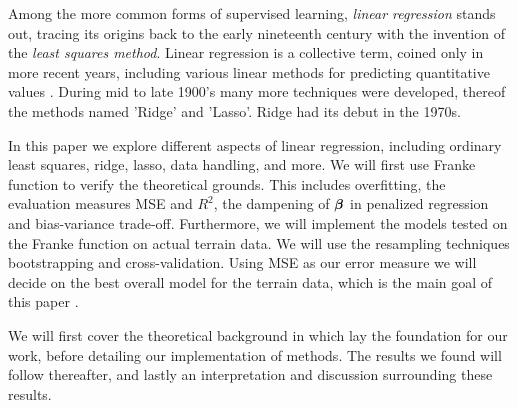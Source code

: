 Among the more common forms of supervised learning, \textit{linear regression} stands out, tracing its origins back to the early nineteenth century with the invention of the \textit{least squares method}. 
Linear regression is a collective term, coined only in more recent years, including various linear methods for predicting quantitative values \citep[ p.~5]{james}. During mid to late 1900's many more techniques were developed, thereof the methods named 'Ridge' and 'Lasso'. Ridge had its debut in the 1970s. 


In this paper we explore different aspects of linear regression, including ordinary least squares, ridge, lasso, data handling, and more. 
We will first use Franke function to verify the theoretical grounds. This includes overfitting, the evaluation measures MSE and $R^2$, the dampening of $\boldsymbol{\beta}$ in penalized regression and bias-variance trade-off. Furthermore, we will implement the models tested on the Franke function on actual terrain data. We will use the resampling techniques bootstrapping and cross-validation. Using MSE as our error measure we will decide on the best overall model for the terrain data, which is the main goal of this paper . 


We will first cover the theoretical background in which lay the foundation for our work, before detailing our implementation of methods. 
The results we found will follow thereafter, and lastly an interpretation and discussion surrounding these results. 


